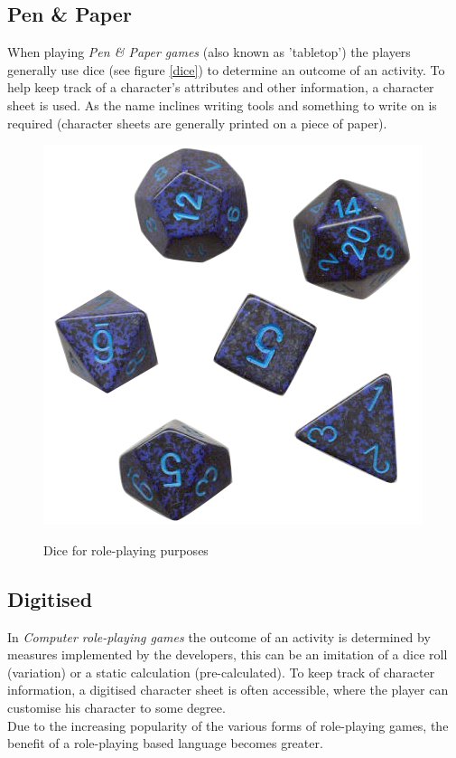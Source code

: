 \subsection*{Pen \& Paper}
When playing \emph{Pen \& Paper games} (also known as 'tabletop') the players generally use dice (see figure \vref{dice}) to determine an outcome of an activity. To help keep track of a character's attributes and other information, a character sheet is used.
As the name inclines writing tools and something to write on is required (character sheets are generally printed on a piece of paper).
\begin{figure}[!h]
\centering
\includegraphics[scale=0.4]{img/rpgdice.png}
\caption{Dice for role-playing purposes}
\cite{rpgdice}
\label{dice}
\end{figure}
\subsection*{Digitised}
In \emph{Computer role-playing games} the outcome of an activity is determined by measures implemented by the developers, this can be an imitation of a dice roll (variation) or a static calculation (pre-calculated).
To keep track of character information, a digitised character sheet is often accessible, where the player can customise his character to some degree.\\
Due to the increasing popularity of the various forms of role-playing games, the benefit of a role-playing based language becomes greater.\\\\


